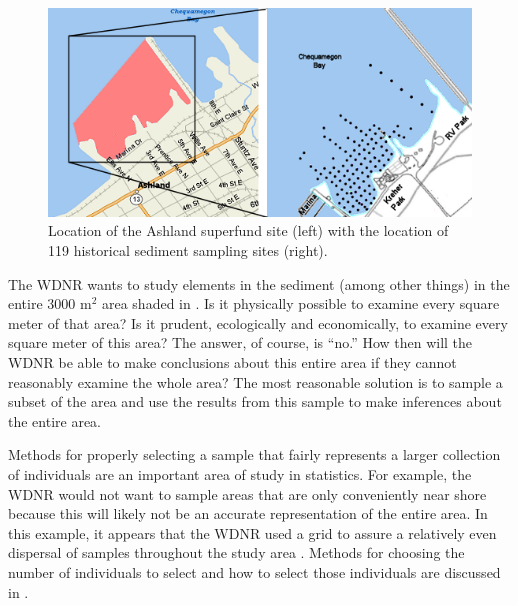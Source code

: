 \documentclass[10pt,openany]{book}\usepackage[]{graphicx}\usepackage[]{color}
\begin{document}
\begin{figure}[htbp]
  \centering
    \includegraphics[width=6in]{Figs/Kreher_Park_Map.png}
  \caption{Location of the Ashland superfund site (left) with the location of 119 historical sediment sampling sites (right).}
  \label{fig:KreherParkMap}
\end{figure}

The WDNR wants to study elements in the sediment (among other things) in the entire 3000 m$^2$ area shaded in .  Is it physically possible to examine every square meter of that area?  Is it prudent, ecologically and economically, to examine every square meter of this area?  The answer, of course, is ``no.''  How then will the WDNR be able to make conclusions about this entire area if they cannot reasonably examine the whole area?  The most reasonable solution is to sample a subset of the area and use the results from this sample to make inferences about the entire area.

Methods for properly selecting a sample that fairly represents a larger collection of individuals are an important area of study in statistics.  For example, the WDNR would not want to sample areas that are only conveniently near shore because this will likely not be an accurate representation of the entire area.  In this example, it appears that the WDNR used a grid to assure a relatively even dispersal of samples throughout the study area .  Methods for choosing the number of individuals to select and how to select those individuals are discussed in .
\end{document}
